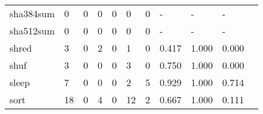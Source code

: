 \begin{longtable}{lp{1.2cm}p{1.2cm}p{1.2cm}p{1.2cm}p{1.2cm}p{1.2cm}p{1.2cm}p{1.2cm}p{1.2cm}p{1.2cm}}
sha384sum &                                     0 &                                                  0 &                                                  0 &                                                  0 &                                                  0 &                                                  0 &                                                  - &                                                  - &                                                  - \\
sha512sum &                                     0 &                                                  0 &                                                  0 &                                                  0 &                                                  0 &                                                  0 &                                                  - &                                                  - &                                                  - \\
shred     &                                     3 &                                                  0 &                                                  2 &                                                  0 &                                                  1 &                                                  0 &                                              0.417 &                                              1.000 &                                              0.000 \\
shuf      &                                     3 &                                                  0 &                                                  0 &                                                  0 &                                                  3 &                                                  0 &                                              0.750 &                                              1.000 &                                              0.000 \\
sleep     &                                     7 &                                                  0 &                                                  0 &                                                  0 &                                                  2 &                                                  5 &                                              0.929 &                                              1.000 &                                              0.714 \\
sort      &                                    18 &                                                  0 &                                                  4 &                                                  0 &                                                 12 &                                                  2 &                                              0.667 &                                              1.000 &                                              0.111 \\

\end{longtable}
